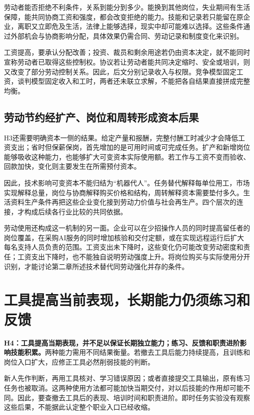 \documentclass[UTF8,fontset=windows,12pt,a4paper,oneside,openany]{ctexbook}
\begin{document}
劳动者能否拒绝不利条件，关系到能分到多少。能换到其他岗位，失业期间有生活保障，能共同协商工资和强度，都会改变拒绝的能力。技能和记录若只能留在原企业，离职又立即危及生活，法律上能够选择，现实中却可能难以选择。这些条件通过外部机会与协商影响分配，具体效果仍需合同、劳动记录和制度变化来识别。

工资提高，要承认分配改善；投资、裁员和剩余用途若仍由资本决定，就不能同时宣称劳动者已取得这些控制权。协议若让劳动者能共同决定缩时、安全或培训，则又改变了部分劳动控制关系。因此，后文分别记录收入与权限。竞争模型固定工资，谈判模型固定收入和工时，两者还未联立求解，不能把各自结果直接拼成完整均衡。

\subsection{劳动节约经扩产、岗位和周转形成资本后果}

H3还需要明确资本一侧的结果。给定产量和报酬，完整付酬工时减少才会降低工资支出；省时但保薪保岗，首先增加的是可用时间或可完成任务。扩产和新增岗位能够吸收这种能力，也能够扩大可变资本实际使用额。若工作与工资不变而验收、回款加快，变化则主要发生在所需预付资本。

因此，技术影响可变资本不能归结为“机器代人”。任务替代解释每单位用工，市场实现解释总量，岗位与协商解释购买价格和结构，周转解释资本需要垫付多久。生活资料生产条件再把这些企业变化接到劳动力价值与社会再生产。四个层次的连接，才构成后续各行业比较的共同依据。

劳动使用还构成这一机制的另一面。企业可以在少招操作人员的同时提高留任者的岗位覆盖，在采购AI服务的同时增加核验和交付定额，或在实现远程运行后扩大每名支持人员负责的范围。工资支出未下降时，这些变化仍可能改变劳动密度和责任；工资支出下降时，也不能独自说明劳动强度上升。将岗位购买与实际使用分开识别，才能讨论第二章所述技术替代同劳动强化并存的条件。

\section{工具提高当前表现，长期能力仍须练习和反馈}

\textbf{H4：工具提高当期表现，并不足以保证长期独立能力；练习、反馈和职责进阶影响技能积累。}两种能力需用不同结果衡量。若撤去工具后能力持续提高，且训练和岗位入口扩大，应修正工具必然削弱技能的判断。

新人先作判断，再用工具核对、学习错误原因；或者直接提交工具输出，原有练习任务也被取消。这两种使用方法都可能加快当期交付，对以后技能的作用却可能不同。因此，要查撤去工具后的表现、培训时间和职责进阶。即时任务实验没有观察这些后果，不能据此认定整个职业入口已经收缩。
\end{document}
